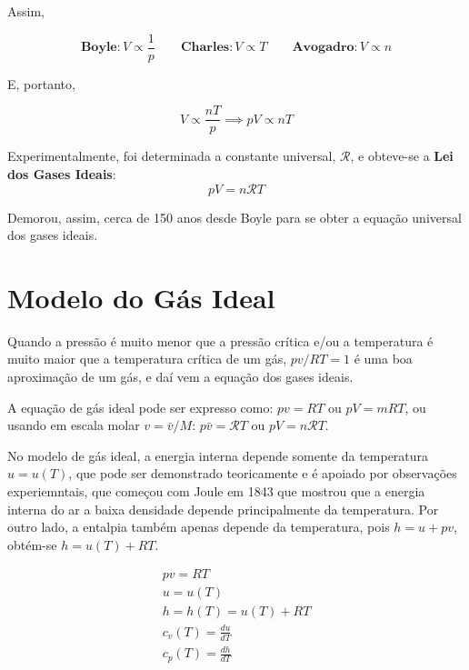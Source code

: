 \begin{historybox}
    Assim,

    \begin{equation*}
        \textbf{Boyle}: V \propto \frac{1}{p} \qquad \textbf{Charles}: V \propto T \qquad \textbf{Avogadro}: V \propto n
    \end{equation*}

    E, portanto,

    \begin{equation*}
        V \propto \frac{nT}{p} \implies p V \propto n T
    \end{equation*}

    Experimentalmente, foi determinada a constante universal, $\mathcal{R}$, e obteve-se a \textbf{Lei dos Gases Ideais}:
    \begin{equation}
        pV = n \mathcal{R} T
    \end{equation}

    Demorou, assim, cerca de 150 anos desde Boyle para se obter a equação universal dos gases ideais.
\end{historybox}

\section{Modelo do Gás Ideal}

Quando a pressão é muito menor que a pressão crítica e/ou a temperatura é muito maior que a temperatura crítica de um gás, $pv / RT = 1$ é uma boa aproximação de um gás, e daí vem a equação dos gases ideais.

A equação de gás ideal pode ser expresso como: $pv = RT$ ou $pV= m RT$, ou usando em escala molar $v = \bar{v} / M$: $p \bar{v} = \mathcal{R} T$ ou $p V = n \mathcal{R} T$.

No modelo de gás ideal, a energia interna depende somente da temperatura $u = u(T)$, que pode ser demonstrado teoricamente e é apoiado por observações experiemntais, que começou com Joule em 1843 que mostrou que a energia interna do ar a baixa densidade depende principalmente da temperatura. Por outro lado, a entalpia também apenas depende da temperatura, pois $h = u + pv$, obtém-se $h = u(T) + RT$.

\begin{gather}
    pv = RT  \\
    u = u(T) \\
    h = h(T) = u(T) + RT \label{eq:entalpia-ideal} \\
    c_v(T) = \frac{du}{dT} \\
    c_p(T) = \frac{dh}{dT}
\end{gather}

